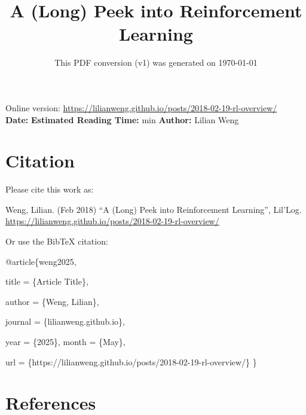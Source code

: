 \documentclass[12pt]{article}
\title{A (Long) Peek into Reinforcement Learning}
\date{This PDF conversion (v1) was generated on \today\footnotemark}
\begin{document}
\maketitle
\begin{center}
    Online version: \url{https://lilianweng.github.io/posts/2018-02-19-rl-overview/} \\
    \textbf{Date:} \quad
    \textbf{Estimated Reading Time:}  min \quad
    \textbf{Author:} Lilian Weng
\end{center}




\newpage
\tableofcontents
\newpage
\vspace{1em}
\n\n\n\section{Citation}
Please cite this work as:

\begin{tcolorbox}[colback=black!5!white, colframe=black!80!white, boxrule=0.5pt, arc=2mm, left=1mm, right=1mm, top=1mm, bottom=1mm]
  Weng, Lilian. (Feb 2018) ``A (Long) Peek into Reinforcement Learning'', Lil'Log. \url{https://lilianweng.github.io/posts/2018-02-19-rl-overview/}
  \end{tcolorbox}

Or use the BibTeX citation:

\begin{tcolorbox}[
    colback=black!5!white,
    colframe=black!80!white,
    boxrule=0.5pt,
    arc=2mm,
    left=1mm,
    right=1mm,
    top=1mm,
    bottom=1mm,
    listing only,
    listing options={
      basicstyle=\ttfamily\footnotesize,
      breaklines=true,
      literate={\{}{{\char`\{}}1 {\}}{{\char`\}}}1
    }
  ]
  @article\{weng2025,

    title   = \{Article Title\},

    author  = \{Weng, Lilian\},

    journal = \{lilianweng.github.io\},

    year    = \{2025\},
    month   = \{May\},

    url     = \{https://lilianweng.github.io/posts/2018-02-19-rl-overview/\}\n
  \}
  \end{tcolorbox}

\newpage
\section{References}

\n
\end{document}
